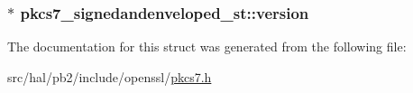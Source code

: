 \subsubsection[{\texorpdfstring{version}{version}}]{$\ast$ pkcs7\+\_\+signedandenveloped\+\_\+st\+::version}\hypertarget{structpkcs7__signedandenveloped__st_afa74cdf71197c1a7cdc53b1ee662802c}{}\label{structpkcs7__signedandenveloped__st_afa74cdf71197c1a7cdc53b1ee662802c}


The documentation for this struct was generated from the following file\+:\begin{DoxyCompactItemize}
\item 
src/hal/pb2/include/openssl/\hyperlink{pkcs7_8h}{pkcs7.\+h}\end{DoxyCompactItemize}
